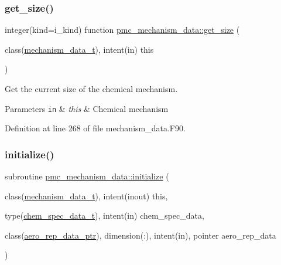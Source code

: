 \subsubsection{\texorpdfstring{get\+\_\+size()}{get\_size()}}
{\footnotesize\ttfamily integer(kind=i\+\_\+kind) function \mbox{\hyperlink{interfacepmc__aero__rep__data_1_1get__size}{pmc\+\_\+mechanism\+\_\+data\+::get\+\_\+size}} (\begin{DoxyParamCaption}\item[{class(\mbox{\hyperlink{structpmc__mechanism__data_1_1mechanism__data__t}{mechanism\+\_\+data\+\_\+t}}), intent(in)}]{this }\end{DoxyParamCaption})\hspace{0.3cm}{\ttfamily [private]}}



Get the current size of the chemical mechanism. 


\begin{DoxyParams}[1]{Parameters}
\mbox{\tt in}  & {\em this} & Chemical mechanism \\
\hline
\end{DoxyParams}


Definition at line 268 of file mechanism\+\_\+data.\+F90.

\mbox{\label{namespacepmc__mechanism__data_af37833fbb878f0add05d26cdbaa5cd33}} 
\subsubsection{\texorpdfstring{initialize()}{initialize()}}
{\footnotesize\ttfamily subroutine \mbox{\hyperlink{interfacepmc__aero__rep__data_1_1initialize}{pmc\+\_\+mechanism\+\_\+data\+::initialize}} (\begin{DoxyParamCaption}\item[{class(\mbox{\hyperlink{structpmc__mechanism__data_1_1mechanism__data__t}{mechanism\+\_\+data\+\_\+t}}), intent(inout)}]{this,  }\item[{type(\mbox{\hyperlink{structpmc__chem__spec__data_1_1chem__spec__data__t}{chem\+\_\+spec\+\_\+data\+\_\+t}}), intent(in)}]{chem\+\_\+spec\+\_\+data,  }\item[{class(\mbox{\hyperlink{structpmc__aero__rep__data_1_1aero__rep__data__ptr}{aero\+\_\+rep\+\_\+data\+\_\+ptr}}), dimension(\+:), intent(in), pointer}]{aero\+\_\+rep\+\_\+data }\end{DoxyParamCaption})\hspace{0.3cm}{\ttfamily [private]}}



